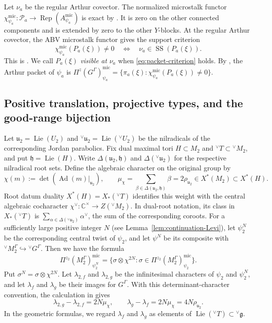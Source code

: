 \documentclass[10pt]{amsart}
\numberwithin{equation}{section}
\theoremstyle{plain}
\theoremstyle{definition}
\theoremstyle{remark}
\DeclareMathOperator{\Rep}{Rep}
\DeclareMathOperator{\Lie}{Lie}
\newcommand{\CC}{\mathbb C}
\newcommand{\fg}{\mathfrak g}
\newcommand{\fu}{\mathfrak u}
\newcommand{\fh}{\mathfrak h}
\newcommand{\vG}{{}^{\vee}G}
\newcommand{\vT}{{}^{\vee}T}
\newcommand{\vM}{{}^{\vee}M}
\newcommand{\vU}{{}^{\vee}U}
\newcommand{\vfg}{{}^{\vee}\fg}
\newcommand{\vfu}{{}^{\vee}\fu}
\newcommand{\mic}{\mathrm{mic}}
\newcommand{\SSupp}{\operatorname{SS}}
\begin{document}
Let $\nu_a$ be the regular Arthur covector. The normalized microstalk
functor $\chi_{\psi_a}^{\mic}\colon\mathcal P_a\to
\Rep(A_{\psi_a}^{\mic})$ is exact by \cite[Theorem~24.8(c)]{ABV92}.
It is zero on the other connected components and is extended by zero
to the other $Y$-blocks. At the regular Arthur
covector, the ABV microstalk functor gives the support criterion
\begin{equation}\label{eq:packet-criterion}
 \chi_{\psi_a}^{\mic}(P_a(\xi))\neq0
 \quad\Longleftrightarrow\quad
 \nu_a\in\SSupp(P_a(\xi)).
\end{equation}
This is \cite[Theorem~24.8(a),(c), Corollary~24.9(a), and
Proposition~19.12(c)]{ABV92}. We call $P_a(\xi)$ \emph{visible at $\nu_a$}
when \eqref{eq:packet-criterion} holds. By
\cite[Definition~22.6]{ABV92}, the Arthur packet of $\psi_a$ is
$\Pi^{z}(G^\Gamma)^{\mic}_{\psi_a}
=\{\pi_a(\xi):\chi_{\psi_a}^{\mic}(P_a(\xi))\neq0\}$.

\subsection{Positive translation, projective types, and the good-range bijection}

Let $\fu_2=\Lie(U_2)$ and $\vfu_2=\Lie(\vU_2)$ be the nilradicals
of the corresponding Jordan parabolics. Fix dual maximal tori
$H\subset M_2$ and $\vT\subset\vM_2$, and put $\fh=\Lie(H)$.
Write $\Delta(\fu_2,\fh)$ and $\Delta(\vfu_2)$ for the respective
nilradical root sets. Define the algebraic character on the original group by
\[
 \chi(m):=\det\!\left(\operatorname{Ad}(m)|_{\fu_2}\right),
 \qquad
 \mu_\chi=\sum_{\beta\in\Delta(\fu_2,\fh)}\beta
          =2\rho_{\fu_2}\in X^*(M_2)\subset X^*(H).
\]
Root datum duality $X^*(H)=X_*(\vT)$ identifies this weight with the
central algebraic cocharacter
$\chi^\vee\colon\CC^\times\to Z(\vM_2)$. In dual-root notation,
its class in $X_*(\vT)$ is $\sum_{\alpha\in\Delta(\vfu_2)}\alpha^\vee$,
the sum of the corresponding coroots.
For a sufficiently large positive integer $N$ (see
Lemma~\ref{lem:continuation-Levi}), let $\psi_2^N$ be the corresponding
central twist of
$\psi_2$, and let $\psi^N$ be its composite with
$\vM_2^\Gamma\hookrightarrow\vG^\Gamma$. Then we have the formula
\cite[(4.6.1)]{AIMV26} 
\begin{equation}\label{eq:packet-twist}
 \Pi^{z_2}(M_2^\Gamma)^{\mic}_{\psi_2^N}
 =
 \{\sigma\otimes\chi^{2N}:
   \sigma\in\Pi^{z_2}(M_2^\Gamma)^{\mic}_{\psi_2}\}.
\end{equation}
Put $\sigma^N=\sigma\otimes\chi^{2N}$. Let $\lambda_{2,f}$ and
$\lambda_{2,g}$ be the infinitesimal characters of $\psi_2$ and
$\psi_2^N$, and let $\lambda_f$ and $\lambda_g$ be their images for
$G^\Gamma$. With this determinant-character convention, the calculation in
\cite[proof of Theorem~4.6.1, immediately after (4.6.1)]{AIMV26} gives
\begin{equation}\label{eq:translation}
 \lambda_{2,g}-\lambda_{2,f}=2N\mu_\chi,
 \qquad
 \lambda_g-\lambda_f=2N\mu_\chi=4N\rho_{\fu_2}.
\end{equation}
In the geometric formulas, we regard $\lambda_f$ and $\lambda_g$ as elements
of $\Lie(\vT)\subset\vfg$.
\end{document}
